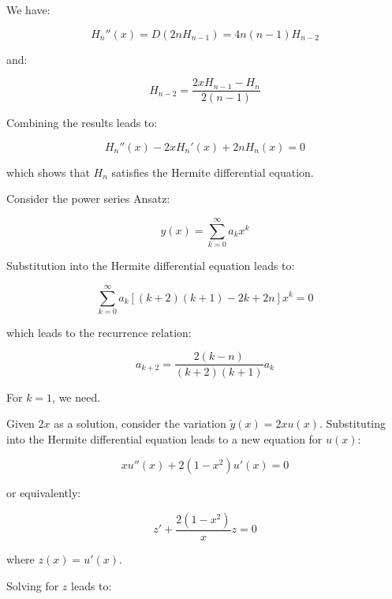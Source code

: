 \documentclass[12pt]{article}
\begin{document}
We have:

\begin{equation}
    H_{n}''(x)  = D(2n H_{n-1}) = 4n(n-1) H_{n-2}
\end{equation}

and:

\begin{equation}
    H_{n-2} = \frac{2x H_{n-1} - H_{n}}{2(n-1)}
\end{equation}

Combining the results leads to:

\begin{equation}
    H_{n}''(x) - 2x H_{n}'(x) + 2n H_{n}(x) = 0
\end{equation}

which shows that $H_{n}$ satisfies the Hermite differential equation.

Consider the power series Ansatz:

\begin{equation}
    y(x) = \sum_{k=0}^{\infty} a_{k} x^{k}
\end{equation}

Substitution into the Hermite differential equation leads to:

\begin{equation}
    \sum_{k=0}^{\infty} a_{k} \left[ (k + 2)(k + 1) - 2k + 2n \right] x^{k} = 0
\end{equation}

which leads to the recurrence relation:

\begin{equation}
    a_{k+2} = \frac{2(k - n)}{(k + 2)(k + 1)} a_{k}
\end{equation}

For $k = 1$, we need.

Given $2x$ as a solution, consider the variation $\tilde{y}(x) = 2xu(x)$. Substituting into the Hermite differential equation leads to a new equation for $u(x)$:

\begin{equation}
    x u''(x) + 2(1 - x^{2}) u'(x) = 0
\end{equation}

or equivalently:

\begin{equation}
    z' + \frac{2(1 - x^{2})}{x} z = 0
\end{equation}

where $z(x) = u'(x)$.

Solving for $z$ leads to:
\end{document}
